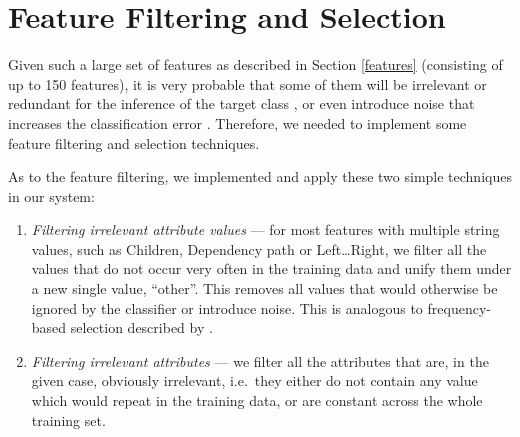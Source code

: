 \documentclass[12pt,notitlepage]{report}
\begin{document}
\section{Feature Filtering and Selection}\label{featsel}

Given such a large set of features as described in Section \ref{features} (consisting of up to 150 features), it is very probable that some of them will be irrelevant or redundant for the inference of the target class \citep{john94}, or even introduce noise that increases the classification error \citep[p. 251]{manning08}. Therefore, we needed to implement some feature filtering and selection techniques.

As to the feature filtering, we implemented and apply these two simple techniques in our system:
\begin{enumerate}
    \item \emph{Filtering irrelevant attribute values} --- for most features with multiple string values, such as Children, Dependency path or Left\dots Right, we filter all the values that do not occur very often in the training data and unify them under a new single value, ``other''. This removes all values that would otherwise be ignored by the classifier or introduce noise. This is analogous to frequency-based selection described by \citet[p. 257]{manning08}.
    \item \emph{Filtering irrelevant attributes} --- we filter all the attributes that are, in the given case, obviously irrelevant, i.e.\ they either do not contain any value which would repeat in the training data, or are constant across the whole training set.
\end{enumerate}
\end{document}

